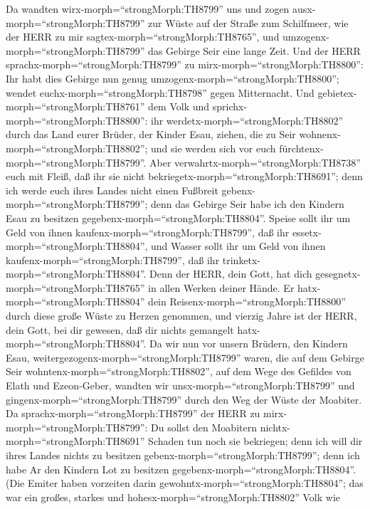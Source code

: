  Da wandten wirx-morph=``strongMorph:TH8799'' uns und zogen
ausx-morph=``strongMorph:TH8799'' zur Wüste auf der Straße zum
Schilfmeer, wie der HERR zu mir sagtex-morph=``strongMorph:TH8765'', und
umzogenx-morph=``strongMorph:TH8799'' das Gebirge Seir eine lange Zeit.
 Und der HERR sprachx-morph=``strongMorph:TH8799'' zu
mirx-morph=``strongMorph:TH8800'':  Ihr habt dies Gebirge
nun genug umzogenx-morph=``strongMorph:TH8800''; wendet
euchx-morph=``strongMorph:TH8798'' gegen Mitternacht.  Und
gebietex-morph=``strongMorph:TH8761'' dem Volk und
sprichx-morph=``strongMorph:TH8800'': ihr
werdetx-morph=``strongMorph:TH8802'' durch das Land eurer Brüder, der
Kinder Esau, ziehen, die zu Seir wohnenx-morph=``strongMorph:TH8802'';
und sie werden sich vor euch fürchtenx-morph=``strongMorph:TH8799''.
Aber verwahrtx-morph=``strongMorph:TH8738'' euch mit Fleiß, 
daß ihr sie nicht bekriegetx-morph=``strongMorph:TH8691''; denn ich
werde euch ihres Landes nicht einen Fußbreit
gebenx-morph=``strongMorph:TH8799''; denn das Gebirge Seir habe ich den
Kindern Esau zu besitzen gegebenx-morph=``strongMorph:TH8804''.
 Speise sollt ihr um Geld von ihnen
kaufenx-morph=``strongMorph:TH8799'', daß ihr
essetx-morph=``strongMorph:TH8804'', und Wasser sollt ihr um Geld von
ihnen kaufenx-morph=``strongMorph:TH8799'', daß ihr
trinketx-morph=``strongMorph:TH8804''.  Denn der HERR, dein
Gott, hat dich gesegnetx-morph=``strongMorph:TH8765'' in allen Werken
deiner Hände. Er hatx-morph=``strongMorph:TH8804'' dein
Reisenx-morph=``strongMorph:TH8800'' durch diese große Wüste zu Herzen
genommen, und vierzig Jahre ist der HERR, dein Gott, bei dir gewesen,
daß dir nichts gemangelt hatx-morph=``strongMorph:TH8804''. 
Da wir nun vor unsern Brüdern, den Kindern Esau,
weitergezogenx-morph=``strongMorph:TH8799'' waren, die auf dem Gebirge
Seir wohntenx-morph=``strongMorph:TH8802'', auf dem Wege des Gefildes
von Elath und Ezeon-Geber, wandten wir unsx-morph=``strongMorph:TH8799''
und gingenx-morph=``strongMorph:TH8799'' durch den Weg der Wüste der
Moabiter.  Da sprachx-morph=``strongMorph:TH8799'' der HERR
zu mirx-morph=``strongMorph:TH8799'': Du sollst den Moabitern
nichtx-morph=``strongMorph:TH8691'' Schaden tun noch sie bekriegen; denn
ich will dir ihres Landes nichts zu besitzen
gebenx-morph=``strongMorph:TH8799''; denn ich habe Ar den Kindern Lot zu
besitzen gegebenx-morph=``strongMorph:TH8804''.  (Die
Emiter haben vorzeiten darin gewohntx-morph=``strongMorph:TH8804''; das
war ein großes, starkes und hohesx-morph=``strongMorph:TH8802'' Volk wie
